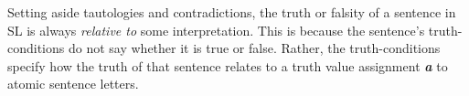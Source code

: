 {{Setting aside tautologies and contradictions, the truth or falsity of a sentence in SL is always \emph{relative to} some interpretation. This is because the sentence's truth-conditions do not say whether it is true or false. Rather, the truth-conditions specify how the truth of that sentence relates to a truth value assignment \textit{\textbf{a}} to atomic sentence letters.









}}
